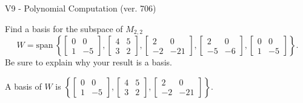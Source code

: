 \begin{exercise}
  \begin{exerciseTitle}V9 - Polynomial Computation (ver. 706)\end{exerciseTitle}
  \begin{exerciseStatement}
    Find a basis for the subspace of \(M_{2,2}\) 
\[W=\mathrm{span}\ \left\{\left[\begin{array}{cc}
0 & 0 \\
1 & -5
\end{array}\right] , \left[\begin{array}{cc}
4 & 5 \\
3 & 2
\end{array}\right] , \left[\begin{array}{cc}
2 & 0 \\
-2 & -21
\end{array}\right] , \left[\begin{array}{cc}
2 & 0 \\
-5 & -6
\end{array}\right] , \left[\begin{array}{cc}
0 & 0 \\
1 & -5
\end{array}\right]\right\}.\]
 Be sure to explain why your result is a basis.


  \end{exerciseStatement}
  \begin{exerciseAnswer}
   A basis of \(W\) is  \(\left\{\left[\begin{array}{cc}
0 & 0 \\
1 & -5
\end{array}\right] , \left[\begin{array}{cc}
4 & 5 \\
3 & 2
\end{array}\right] , \left[\begin{array}{cc}
2 & 0 \\
-2 & -21
\end{array}\right]\right\}\).
  


  \end{exerciseAnswer}
\end{exercise}
